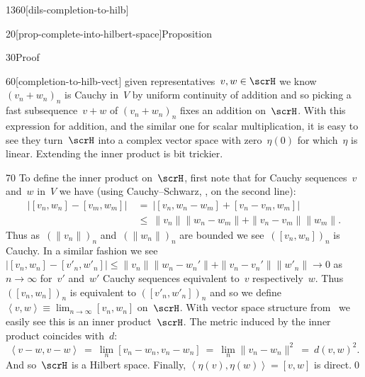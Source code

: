 \begin{parsec}{1360}[dils-completion-to-hilb]
\begin{point}{20}[prop-complete-into-hilbert-space]{Proposition}
\begin{point}{30}{Proof}
\begin{point}{60}[completion-to-hilb-vect]
    given representatives~$v,w \in \scrH$
    we know~$(v_n+w_n)_n$ is Cauchy in~$V$
    by uniform continuity of addition and so
    picking a fast subsequence~$v+w$ of $(v_n+w_n)_n$
        fixes an addition on~$\scrH$.
With this expression for addition, and the similar one for
    scalar multiplication, it is easy to see
    they turn~$\scrH$ into a complex vector space with zero~$\eta(0)$
    for which~$\eta$ is linear.
Extending the inner product is bit trickier.
\end{point}
\begin{point}{70}%
To define the inner product on~$\scrH$,
first note that for Cauchy sequences~$v$ and~$w$ in~$V$
we have (using Cauchy--Schwarz, , on the second line):
\begin{align*}
    \bigl|[v_n,w_n] - [v_m,w_m]\bigr|
    & \ =\  \bigl|[v_n,w_n-w_m] + [v_n - v_m,w_m]\bigr| \\
    & \ \leq\  \|v_n\| \|w_n - w_m\| + \|v_n-v_m\|\|w_m\|.
\end{align*}
Thus as~$(\|v_n\|)_n$ and~$(\|w_n\|)_n$ are bounded
we see~$([v_n,w_n])_n$ is Cauchy.
In a similar fashion we see~$\bigl|[v_n,w_n] - [v'_n,w'_n]\bigr|
    \leq \|v_n\| \|w_n - w_n'\| + \|v_n-v_n'\|\|w'_n\|\to 0$ as~$n\to \infty$
    for~$v'$ and~$w'$ Cauchy sequences equivalent
to~$v$ respectively~$w$.
Thus
$([v_n,w_n])_n$ is equivalent to
$([v'_n,w'_n])_n$
    and so
    we define~$\left<v,w\right>
        \equiv \lim_{n\to \infty} [v_n,w_n]$ on~$\scrH$.
With vector space structure from~
we easily see this is an inner product~$\scrH$.
The metric induced by the inner product coincides with~$d$:
\begin{equation*}
    \left<v-w,v-w\right>
   \ =\ \lim_{n}[v_n-w_n,v_n-w_n]
    \ =\ \lim_{n}\|v_n-w_n\|^2
    \ =\  d(v,w)^2.
\end{equation*}
And so~$\scrH$ is a Hilbert space.
Finally, $\left<\eta(v),\eta(w)\right>=[v,w]$ is direct.\qed
\end{point}
\end{point}
\end{point}
\end{parsec}

